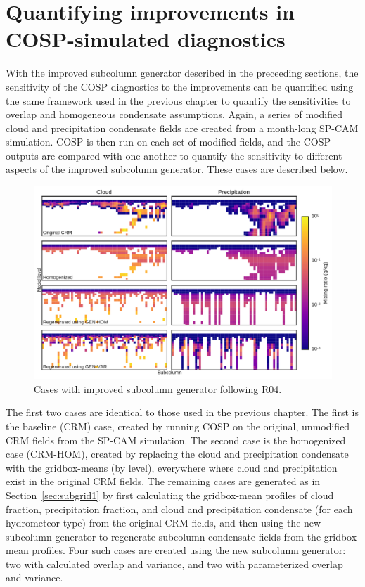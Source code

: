 \section{Quantifying improvements in COSP-simulated
diagnostics}\label{sec:subgrid2Results}

With the improved subcolumn generator described in the preceeding
sections, the sensitivity of the COSP diagnostics to the improvements
can be quantified using the same framework used in the previous chapter
to quantify the sensitivities to overlap and homogeneous condensate
assumptions. Again, a series of modified cloud and precipitation
condensate fields are created from a month-long SP-CAM simulation. COSP
is then run on each set of modified fields, and the COSP outputs are
compared with one another to quantify the sensitivity to different
aspects of the improved subcolumn generator. These cases are described
below.

\begin{figure}[htbp]
\centering
\includegraphics{graphics/mxratio_gen-var.pdf}
\caption{\label{fig:mxratio_gen-var}Cases with improved subcolumn
generator following R04.}\label{fig:mxratioux5fgen-var}
\end{figure}

The first two cases are identical to those used in the previous chapter.
The first is the baseline (CRM) case, created by running COSP on the
original, unmodified CRM fields from the SP-CAM simulation. The second
case is the homogenized case (CRM-HOM), created by replacing the cloud
and precipitation condensate with the gridbox-means (by level),
everywhere where cloud and precipitation exist in the original CRM
fields. The remaining cases are generated as in
Section~\ref{sec:subgrid1} by first calculating the gridbox-mean
profiles of cloud fraction, precipitation fraction, and cloud and
precipitation condensate (for each hydrometeor type) from the original
CRM fields, and then using the new subcolumn generator to regenerate
subcolumn condensate fields from the gridbox-mean profiles. Four such
cases are created using the new subcolumn generator: two with calculated
overlap and variance, and two with parameterized overlap and variance.

